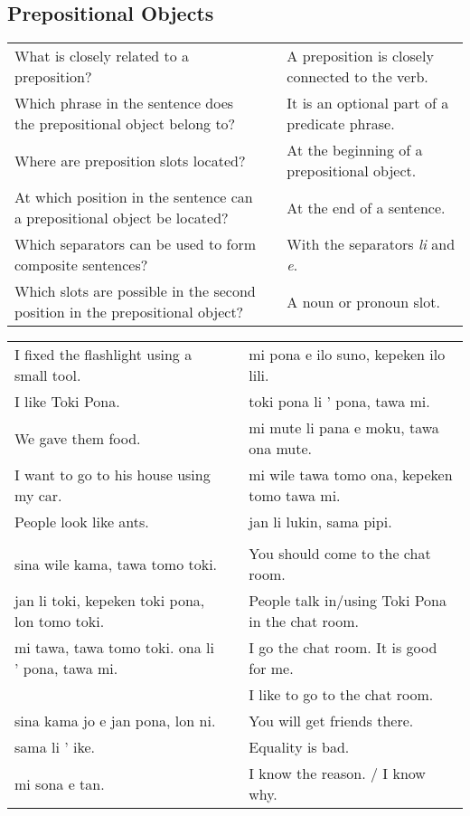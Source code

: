 \subsection*{Prepositional Objects} 
\label{'prepositional_objects'}
%
\begin{supertabular}{p{5,5cm}|ll}
What is closely related to a preposition?  && A preposition is closely connected to the verb. \\ %
Which phrase in the sentence does the prepositional object belong to?  &&  It is an optional part of a predicate phrase.  \\ %
Where are preposition slots located?  &&  At the beginning of a prepositional object. \\ %
At which position in the sentence can a prepositional object be located? && At the end of a sentence. \\ %
Which separators can be used to form composite sentences?  &&  With the separators \textit{li} and \textit{e}. \\ %
Which slots are possible in the second position in the prepositional object?  &&  A noun or pronoun slot. \\ %
\end{supertabular}

\begin{supertabular}{p{5,5cm}|ll}
I fixed the flashlight using a small tool.  && mi pona e ilo suno, kepeken ilo lili. \\ %
I like Toki Pona.  && toki pona li ' pona, tawa mi. \\ %
We gave them food.  && mi mute li pana e moku, tawa ona mute. \\ %
I want to go to his house using my car.  && mi wile tawa tomo ona, kepeken tomo tawa mi. \\ %
People look like ants.  && jan li lukin, sama pipi. \\ %
&& \\ %
sina wile kama, tawa tomo toki.  && You should come to the chat room. \\
jan li toki, kepeken toki pona, lon tomo toki.  && People talk in/using Toki Pona in the chat room. \\
mi tawa, tawa tomo toki. ona li ' pona, tawa mi.  && I go the chat room. It is good for me. \\
                                         && I like to go to the chat room. \\ %
sina kama jo e jan pona, lon ni.  && You will get friends there. \\
sama li ' ike. && Equality is bad. \\
mi sona e tan. && I know the reason. / I know why. \\
\end{supertabular} 

